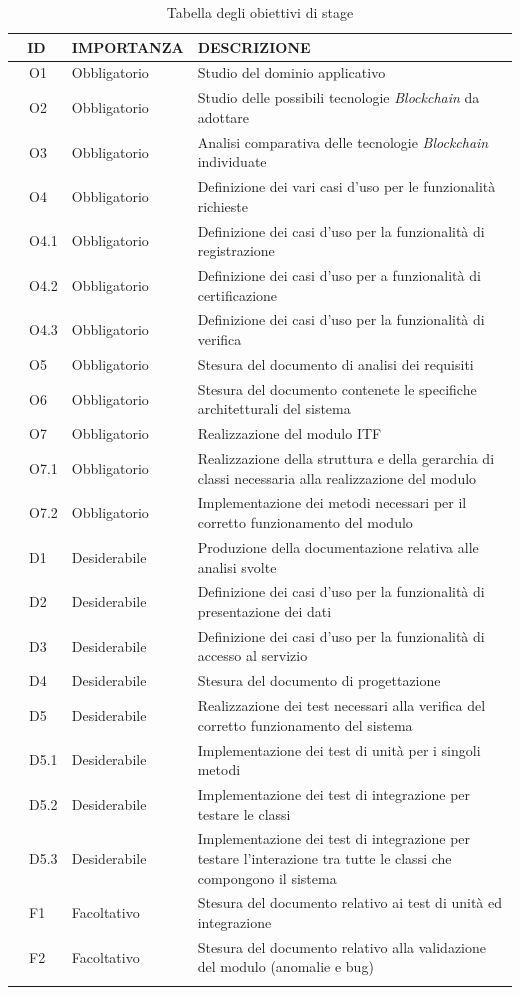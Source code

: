 \begin{longtable}{|r l|p{3cm}|p{10cm}|}
	\hline
	\multicolumn{2}{|c|}{\textbf{ID}} & \textbf{IMPORTANZA} & \textbf{DESCRIZIONE}\tabularnewline
	\hline
	& O1 & Obbligatorio & Studio del dominio applicativo \\\hline
	& O2 & Obbligatorio & Studio delle possibili tecnologie \textit{Blockchain} da adottare \\\hline
	& O3 & Obbligatorio & Analisi comparativa delle tecnologie \textit{Blockchain} individuate \\\hline
	& O4 & Obbligatorio & Definizione dei vari casi d'uso per le funzionalità richieste \\\hline
	& O4.1 & Obbligatorio & Definizione dei casi d'uso per la funzionalità di registrazione \\\hline
	& O4.2 & Obbligatorio & Definizione dei casi d'uso per a funzionalità di certificazione \\\hline
	& O4.3 & Obbligatorio & Definizione dei casi d'uso per la funzionalità di verifica \\\hline
	& O5 & Obbligatorio & Stesura del documento di analisi dei requisiti\\\hline
	& O6 & Obbligatorio & Stesura del documento contenete le specifiche architetturali del sistema \\\hline
	& O7 & Obbligatorio & Realizzazione del modulo \gls{ITF}\\\hline
	& O7.1 & Obbligatorio & Realizzazione della struttura e della gerarchia di classi necessaria alla realizzazione del modulo \\\hline
	& O7.2 & Obbligatorio & Implementazione dei metodi necessari per il corretto funzionamento del modulo\\\hline
	& D1 & Desiderabile & Produzione della documentazione relativa alle analisi svolte \\\hline
	& D2 & Desiderabile & Definizione dei casi d'uso per la funzionalità di presentazione dei dati \\\hline
	& D3 & Desiderabile & Definizione dei casi d'uso per la funzionalità di accesso al servizio \\\hline
	& D4 & Desiderabile & Stesura del documento di progettazione\\\hline
	& D5 & Desiderabile & Realizzazione dei test necessari alla verifica del corretto funzionamento del sistema\\\hline
	& D5.1 & Desiderabile & Implementazione dei test di unità per i singoli metodi\\\hline
	& D5.2 & Desiderabile & Implementazione dei test di integrazione per testare le classi \\\hline
	& D5.3 & Desiderabile & Implementazione dei test di integrazione per testare l'interazione tra tutte le classi che compongono il sistema \\\hline
	& F1 & Facoltativo & Stesura del documento relativo ai test di unità ed integrazione \\\hline	
	& F2 & Facoltativo & Stesura del documento relativo alla validazione del modulo (anomalie e bug) \\\hline
	\caption{Tabella degli obiettivi di stage}
	\label{tab:obiettiviDiStage}
\end{longtable}
